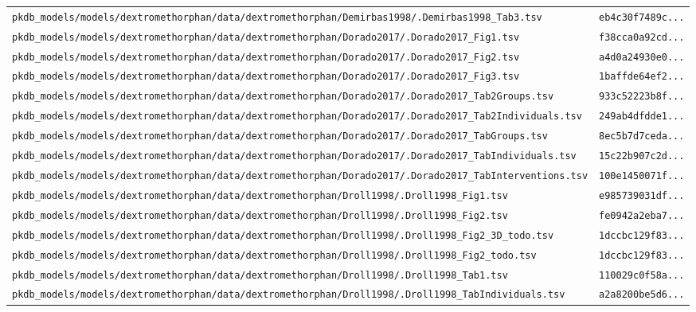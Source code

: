 \begin{longtable}{ll}
\texttt{pkdb\_models/models/dextromethorphan/data/dextromethorphan/Demirbas1998/.Demirbas1998\_Tab3.tsv} & \texttt{eb4c30f7489c...} \\
\texttt{pkdb\_models/models/dextromethorphan/data/dextromethorphan/Dorado2017/.Dorado2017\_Fig1.tsv} & \texttt{f38cca0a92cd...} \\
\texttt{pkdb\_models/models/dextromethorphan/data/dextromethorphan/Dorado2017/.Dorado2017\_Fig2.tsv} & \texttt{a4d0a24930e0...} \\
\texttt{pkdb\_models/models/dextromethorphan/data/dextromethorphan/Dorado2017/.Dorado2017\_Fig3.tsv} & \texttt{1baffde64ef2...} \\
\texttt{pkdb\_models/models/dextromethorphan/data/dextromethorphan/Dorado2017/.Dorado2017\_Tab2Groups.tsv} & \texttt{933c52223b8f...} \\
\texttt{pkdb\_models/models/dextromethorphan/data/dextromethorphan/Dorado2017/.Dorado2017\_Tab2Individuals.tsv} & \texttt{249ab4dfdde1...} \\
\texttt{pkdb\_models/models/dextromethorphan/data/dextromethorphan/Dorado2017/.Dorado2017\_TabGroups.tsv} & \texttt{8ec5b7d7ceda...} \\
\texttt{pkdb\_models/models/dextromethorphan/data/dextromethorphan/Dorado2017/.Dorado2017\_TabIndividuals.tsv} & \texttt{15c22b907c2d...} \\
\texttt{pkdb\_models/models/dextromethorphan/data/dextromethorphan/Dorado2017/.Dorado2017\_TabInterventions.tsv} & \texttt{100e1450071f...} \\
\texttt{pkdb\_models/models/dextromethorphan/data/dextromethorphan/Droll1998/.Droll1998\_Fig1.tsv} & \texttt{e985739031df...} \\
\texttt{pkdb\_models/models/dextromethorphan/data/dextromethorphan/Droll1998/.Droll1998\_Fig2.tsv} & \texttt{fe0942a2eba7...} \\
\texttt{pkdb\_models/models/dextromethorphan/data/dextromethorphan/Droll1998/.Droll1998\_Fig2\_3D\_todo.tsv} & \texttt{1dccbc129f83...} \\
\texttt{pkdb\_models/models/dextromethorphan/data/dextromethorphan/Droll1998/.Droll1998\_Fig2\_todo.tsv} & \texttt{1dccbc129f83...} \\
\texttt{pkdb\_models/models/dextromethorphan/data/dextromethorphan/Droll1998/.Droll1998\_Tab1.tsv} & \texttt{110029c0f58a...} \\
\texttt{pkdb\_models/models/dextromethorphan/data/dextromethorphan/Droll1998/.Droll1998\_TabIndividuals.tsv} & \texttt{a2a8200be5d6...} \\

\end{longtable}
